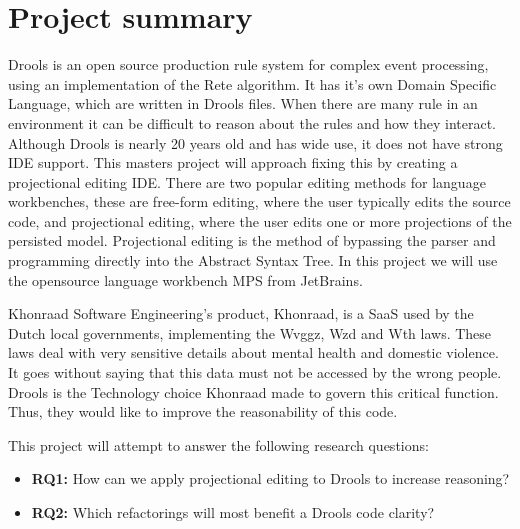 \section{Project summary}
Drools is an open source production rule system for complex event processing, using an implementation of the Rete algorithm.
It has it's own Domain Specific Language, which are written in Drools files.
When there are many rule in an environment it can be difficult to reason about the rules and how they interact.
Although Drools is nearly 20 years old and has wide use, it does not have strong IDE support.
This masters project will approach fixing this by creating a projectional editing IDE.
There are two popular editing methods for language workbenches, these are free-form editing, where the user typically edits the source code, and projectional editing,
where the user edits one or more projections of the persisted model. \cite{erdweg2013state}
Projectional editing is the method of bypassing the parser and programming directly into the Abstract Syntax Tree.
In this project we will use the opensource language workbench MPS from JetBrains.


Khonraad Software Engineering's product, Khonraad, is a SaaS used by the Dutch local governments, implementing the Wvggz, Wzd and Wth laws. 
These laws deal with very sensitive details about mental health and domestic violence.
It goes without saying that this data must not be accessed by the wrong people.
Drools is the Technology choice Khonraad made to govern this critical function.
Thus, they would like to improve the reasonability of this code.



This project will attempt to answer the following research questions:
\begin{itemize}
    \item \textbf{RQ1:} How can we apply projectional editing to Drools to increase reasoning?  
    \item \textbf{RQ2:} Which refactorings will most benefit a Drools code clarity?
\end{itemize}